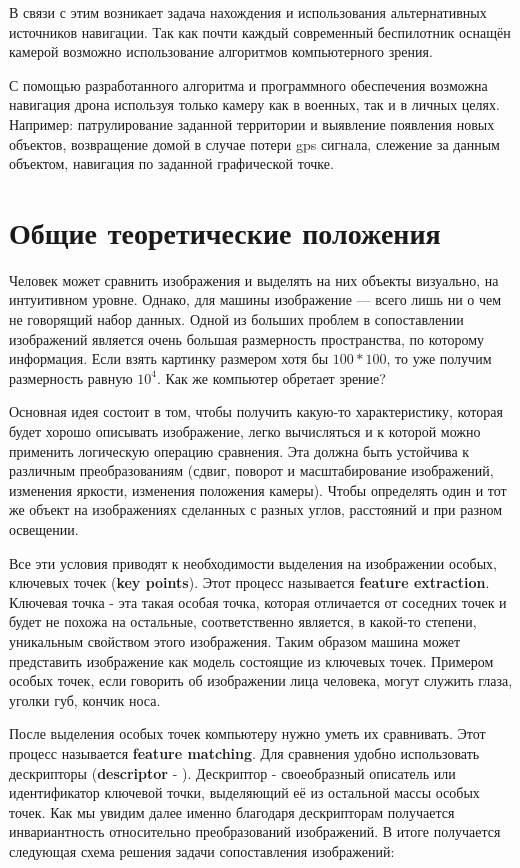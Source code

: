 В связи с этим возникает задача нахождения и использования альтернативных источников навигации. Так как почти каждый современный беспилотник оснащён камерой возможно использование алгоритмов компьютерного зрения.

С помощью разработанного алгоритма и программного обеспечения возможна навигация дрона используя только камеру как в военных, так и в личных целях. Например: патрулирование заданной территории и выявление появления новых объектов, возвращение домой в случае потери gps сигнала, слежение за данным объектом, навигация по заданной графической точке.

\section{Общие теоретические положения}   

Человек может сравнить изображения и выделять на них объекты визуально, на интуитивном уровне. Однако, для машины изображение — всего лишь ни о чем не говорящий набор данных. Одной из больших проблем в сопоставлении изображений является очень большая размерность пространства, по которому  информация. Если взять картинку размером хотя бы $100*100$, то уже получим размерность равную $10^4$. Как же компьютер обретает зрение?

Основная идея состоит в том, чтобы получить какую-то характеристику, которая будет хорошо описывать изображение, легко вычисляться и к которой можно применить логическую операцию сравнения. Эта  должна быть устойчива к различным преобразованиям (сдвиг, поворот и масштабирование изображений, изменения яркости, изменения положения камеры). Чтобы определять один и тот же объект на изображениях сделанных с разных углов, расстояний и при разном освещении.

Все эти условия приводят к необходимости выделения на изображении особых, ключевых точек (\textbf{key points}). Этот процесс называется \textbf{feature extraction}. Ключевая точка - эта такая особая точка, которая отличается от соседних точек и будет не похожа на остальные, соответственно является, в какой-то степени, уникальным свойством этого изображения. Таким образом машина может представить изображение как модель состоящие из ключевых точек. Примером особых точек, если говорить об изображении лица человека, могут служить глаза, уголки губ, кончик носа. 

После выделения особых точек компьютеру нужно уметь их сравнивать. Этот процесс называется \textbf{feature matching}. Для сравнения удобно использовать дескрипторы (\textbf{descriptor} - ). Дескриптор - своеобразный описатель или идентификатор ключевой точки, выделяющий её из остальной массы особых точек. Как мы увидим далее именно благодаря дескрипторам получается инвариантность относительно преобразований изображений. 
В итоге получается следующая схема решения задачи сопоставления изображений:

